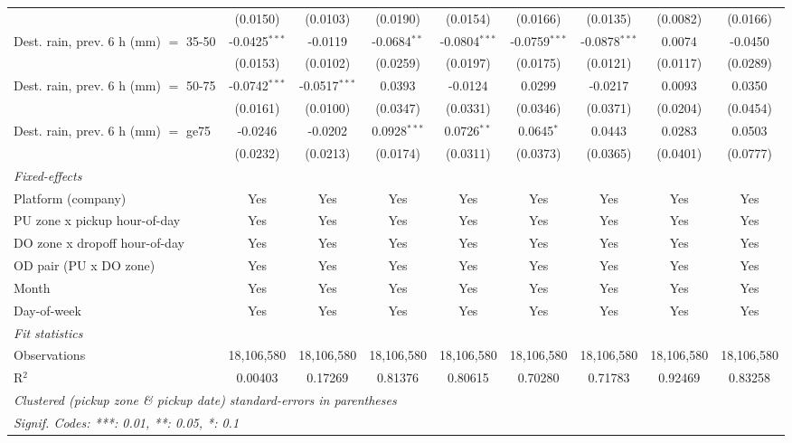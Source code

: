 \begin{tabular}{lcccccccc}
    & (0.0150) & (0.0103) & (0.0190) & (0.0154) & (0.0166) & (0.0135) & (0.0082) & (0.0166)\\
   Dest. rain, prev. 6 h (mm) $=$ 35-50 & -0.0425$^{***}$ & -0.0119 & -0.0684$^{**}$ & -0.0804$^{***}$ & -0.0759$^{***}$ & -0.0878$^{***}$ & 0.0074 & -0.0450\\
    & (0.0153) & (0.0102) & (0.0259) & (0.0197) & (0.0175) & (0.0121) & (0.0117) & (0.0289)\\
   Dest. rain, prev. 6 h (mm) $=$ 50-75 & -0.0742$^{***}$ & -0.0517$^{***}$ & 0.0393 & -0.0124 & 0.0299 & -0.0217 & 0.0093 & 0.0350\\
    & (0.0161) & (0.0100) & (0.0347) & (0.0331) & (0.0346) & (0.0371) & (0.0204) & (0.0454)\\
   Dest. rain, prev. 6 h (mm) $=$ ge75 & -0.0246 & -0.0202 & 0.0928$^{***}$ & 0.0726$^{**}$ & 0.0645$^{*}$ & 0.0443 & 0.0283 & 0.0503\\
    & (0.0232) & (0.0213) & (0.0174) & (0.0311) & (0.0373) & (0.0365) & (0.0401) & (0.0777)\\
   \midrule
   \emph{Fixed-effects}\\
   Platform (company) & Yes & Yes & Yes & Yes & Yes & Yes & Yes & Yes\\
   PU zone x pickup hour-of-day & Yes & Yes & Yes & Yes & Yes & Yes & Yes & Yes\\
   DO zone x dropoff hour-of-day & Yes & Yes & Yes & Yes & Yes & Yes & Yes & Yes\\
   OD pair (PU x DO zone) & Yes & Yes & Yes & Yes & Yes & Yes & Yes & Yes\\
   Month & Yes & Yes & Yes & Yes & Yes & Yes & Yes & Yes\\
   Day-of-week & Yes & Yes & Yes & Yes & Yes & Yes & Yes & Yes\\
   \midrule
   \emph{Fit statistics}\\
   Observations & 18,106,580 & 18,106,580 & 18,106,580 & 18,106,580 & 18,106,580 & 18,106,580 & 18,106,580 & 18,106,580\\
   R$^2$ & 0.00403 & 0.17269 & 0.81376 & 0.80615 & 0.70280 & 0.71783 & 0.92469 & 0.83258\\
   \midrule \midrule
   \multicolumn{9}{l}{\emph{Clustered (pickup zone \& pickup date) standard-errors in parentheses}}\\
   \multicolumn{9}{l}{\emph{Signif. Codes: ***: 0.01, **: 0.05, *: 0.1}}\\
\end{tabular}
 
